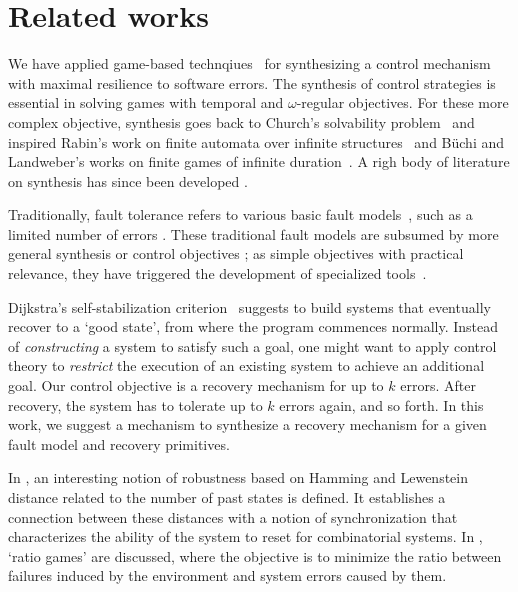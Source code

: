 \section{Related works}
We have applied game-based technqiues~\cite{Church63,PR89a,Rabin69} \label{reply1.related.work.1st.para} 
for synthesizing a control mechanism with maximal resilience to software errors.  
The synthesis of control strategies is essential in solving games with temporal and $\omega$-regular objectives.  
For these more complex objective, synthesis goes back to Church's solvability problem~\cite{Church63} and 
inspired Rabin's work on finite automata over infinite 
structures~\cite{Rabin69} and 
B\"uchi and Landweber's works on finite games 
of infinite duration~\cite{Buchi62,BL69}. 
A righ body of literature on synthesis
has since been developed \cite{AAE04,EKA08,GR09,KV00,PR89b,Rushby92,SF06}.

Traditionally, fault tolerance refers to various basic fault models~\cite{AAE04}, 
such as a limited number of errors \cite{JRT04}.
These traditional fault models are subsumed 
by more general synthesis or control objectives 
\cite{AMP95,AAE04,Thomas94};\label{reply2.RW} 
as simple objectives with practical relevance, 
they have triggered the development of specialized tools~\cite{EKA08,GR09}.

Dijkstra's self-stabilization criterion~\cite{AG93,Dijkstra86} suggests to build systems that eventually recover
to a `good state', from where the program commences normally.
Instead of {\em constructing} a system to satisfy such a goal, one
might want to apply control theory to {\em restrict} the execution of
an existing system to achieve an additional goal.
Our control objective is a recovery mechanism for up to $k$ errors.
After recovery, the system has to tolerate up to $k$ errors again, and so forth.
In this work, 
we suggest a mechanism to synthesize a recovery mechanism for a given fault model and recovery primitives.


In \cite{DHLN10}, an interesting notion of robustness based on Hamming 
and Lewenstein distance related to the number of past states is defined. 
It establishes a connection between these distances with a notion of 
synchronization that characterizes the ability of the system to reset for 
combinatorial systems.
In \cite{BGHJ09}, `ratio games' are discussed, where the objective is 
to minimize the ratio between failures induced by the environment and system errors caused by them.


